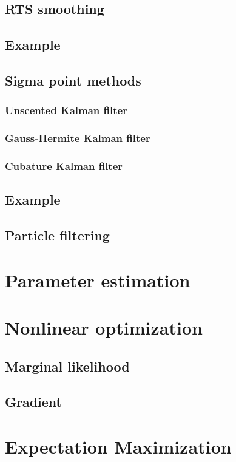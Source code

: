 \documentclass[english,12pt]{article}
\begin{document}
\subsection{RTS smoothing}
\subsection{Example}
\subsection{Sigma point methods}
\subsubsection{Unscented Kalman filter}
\subsubsection{Gauss-Hermite Kalman filter}
\subsubsection{Cubature Kalman filter}
\subsection{Example}
\subsection{Particle filtering}

\section{Parameter estimation}

\section{Nonlinear optimization}
\subsection{Marginal likelihood}
\subsection{Gradient}

\section{Expectation Maximization}
\end{document}
